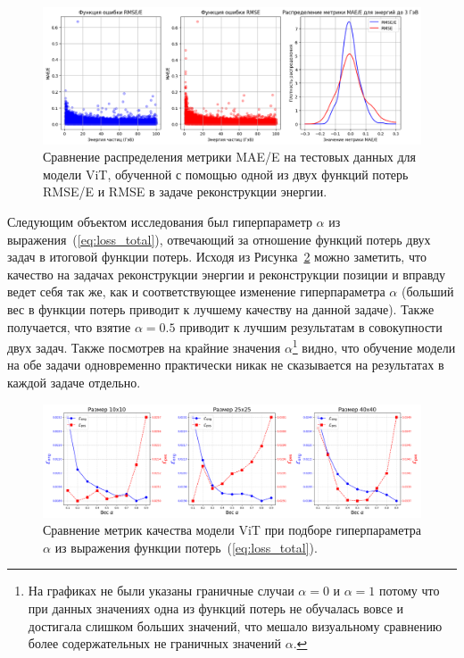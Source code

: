 \documentclass[a4paper,12pt]{extarticle}
\begin{document}
\begin{figure}[t]
    \centering
    \includegraphics[width=1.0\textwidth]{graphics/exp2_distr_comp.png}
    \caption{Сравнение распределения метрики \textsf{MAE/E} на тестовых данных для модели \textsf{ViT}, обученной с помощью одной из двух функций потерь \textsf{RMSE/E} и \textsf{RMSE} в задаче реконструкции энергии.}
    \label{graph:loss_distr}
\end{figure}

Следующим объектом исследования был гиперпараметр $\alpha$ из выражения~(\ref{eq:loss_total}), отвечающий за отношение функций потерь двух задач в итоговой функции потерь. Исходя из Рисунка~\ref{graph:alpha} можно заметить, что качество на задачах реконструкции энергии и реконструкции позиции и вправду ведет себя так же, как и соответствующее изменение гиперпараметра $\alpha$ (больший вес в функции потерь приводит к лучшему качеству на данной задаче). Также получается, что взятие $\alpha = 0.5$ приводит к лучшим результатам в совокупности двух задач. Также посмотрев на крайние значения $\alpha$\footnote{На графиках не были указаны граничные случаи $\alpha = 0$ и $\alpha = 1$ потому что при данных значениях одна из функций потерь не обучалась вовсе и достигала слишком больших значений, что мешало визуальному сравнению более содержательных не граничных значений $\alpha$.} видно, что обучение модели на обе задачи одновременно практически никак не сказывается на результатах в каждой задаче отдельно.

\begin{figure}[t]
    \centering
    \includegraphics[width=1.0\textwidth]{graphics/exp3_alpha.png}
    \caption{Сравнение метрик качества модели \textsf{ViT} при подборе гиперпараметра $\alpha$ из выражения функции потерь~(\ref{eq:loss_total}).}
    \label{graph:alpha}
\end{figure}
\end{document}
